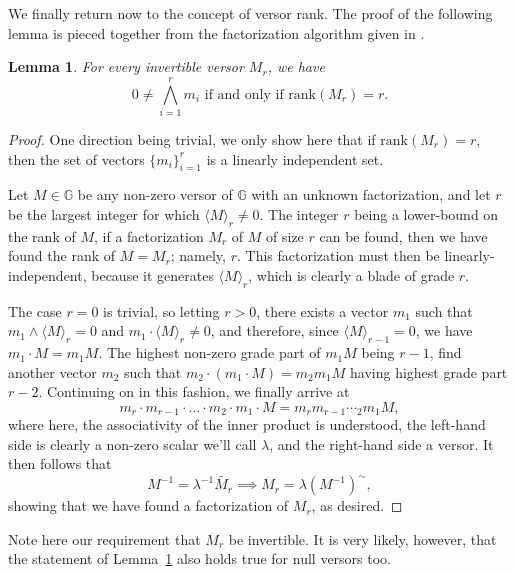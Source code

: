 \documentclass{birkjour}
\newtheorem{lem}[thm]{Lemma}
\theoremstyle{definition}
\theoremstyle{remark}
\numberwithin{equation}{section}
\newcommand{\G}{\mathbb{G}}
\newcommand{\rank}{\mbox{rank}}
\begin{document}
We finally return now to the concept of versor rank.  The proof of the following lemma is pieced together
from the factorization algorithm given in \cite[p. 108]{Perwass09}.
\begin{lem}\label{lem_versor_rank_iff_lin_indep}
For every invertible versor $M_r$, we have
\begin{equation*}
\mbox{$0\neq\bigwedge_{i=1}^r m_i$ if and only if $\rank(M_r)=r$.}
\end{equation*}
\end{lem}
\begin{proof}
One direction being trivial, we only show here that if $\rank(M_r)=r$, then
the set of vectors $\{m_i\}_{i=1}^r$ is a linearly independent set.

Let $M\in\G$ be any non-zero versor of $\G$ with an unknown factorization,
and let $r$ be the largest integer for which $\langle M\rangle_r\neq 0$.
The integer $r$ being a lower-bound on the rank of $M$, if a factorization $M_r$
of $M$ of size $r$ can be found, then we have found the rank of $M=M_r$; namely, $r$.
This factorization must then be linearly-independent, because it generates $\langle M\rangle_r$,
which is clearly a blade of grade $r$.

The case $r=0$ is trivial, so letting $r>0$,
there exists a vector $m_1$ such that $m_1\wedge\langle M\rangle_r=0$
and $m_1\cdot\langle M\rangle_r\neq 0$, and therefore, since $\langle M\rangle_{r-1}=0$,
we have $m_1\cdot M = m_1M$.  The highest non-zero grade part of $m_1M$ being $r-1$,
find another vector $m_2$ such that $m_2\cdot(m_1\cdot M)=m_2m_1M$ having highest grade
part $r-2$.  Continuing on in this fashion,
we finally arrive at
\begin{equation*}
m_r\cdot m_{r-1}\cdot\dots\cdot m_2\cdot m_1\cdot M=m_rm_{r-1}\dotsm_2m_1M,
\end{equation*}
where here, the associativity of the inner product is understood, the left-hand side is clearly a non-zero scalar we'll call $\lambda$,
and the right-hand side a versor.  It then follows that
\begin{equation*}
M^{-1} = \lambda^{-1}\tilde{M_r}\implies M_r = \lambda(M^{-1})^{\sim},
\end{equation*}
showing that we have found a factorization of $M_r$, as desired.
\end{proof}
Note here our requirement that $M_r$ be invertible.  It is very likely, however,
that the statement of Lemma~\ref{lem_versor_rank_iff_lin_indep} also holds true for null versors too.
\end{document}
